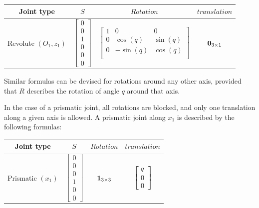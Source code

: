 \begin{table} [ht]
\centering
\begin{tabular}{cccc}
  \toprule
  Joint type & $S$ & $Rotation$ & $translation$ \\
  \midrule
  Revolute $(O_1,z_1)$
  &
  $\begin{bmatrix}
    0 \\ 0 \\ 1 \\ 0 \\ 0 \\ 0
  \end{bmatrix}$
  &
  $\begin{bmatrix}
    1 & 0 & 0 \\
    0 & \cos (q) & \sin (q) \\
    0 & -\sin (q) & \cos (q) \\
  \end{bmatrix}$
  &
  ${\bf 0}_{3\times1}$
  \\
  \bottomrule
\end{tabular}
\end{table}

Similar formulas can be devised for rotations around any other axis, provided that $R$ describes the rotation of angle $q$ around that axis.

In the case of a prismatic joint, all rotations are blocked, and only one translation along a given axis is allowed.
A prismatic joint along $x_1$ is described by the following formulas:

\begin{table} [ht]
\centering
\begin{tabular}{cccc}
  \toprule
  Joint type & $S$ & $Rotation$ & $translation$ \\
  \midrule
  Prismatic $(x_1)$
  &
  $\begin{bmatrix}
    0 \\ 0 \\ 0 \\ 1 \\ 0 \\ 0
  \end{bmatrix}$
  &
  ${\bf 1}_{3\times3} $
  &
  $\begin{bmatrix}
    q \\ 0 \\ 0
  \end{bmatrix}$
  \\
  \bottomrule
\end{tabular}
\end{table}

